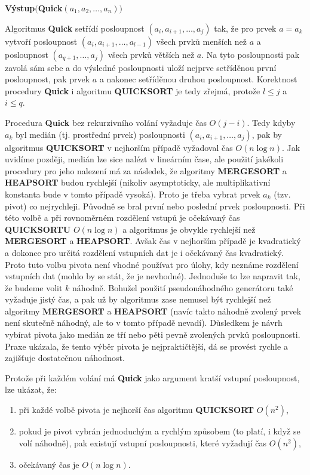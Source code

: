 \documentclass[a4paper,12pt]{article}
\begin{document}
{\bf Výstup$($Quick$(a_1,a_2,\dots,a_n))$

}
Algoritmus {\bf Quick} setřídí posloupnost 
$(a_i,a_{i+1},\dots,a_j)$ tak, že pro prvek $a=a_k$ vytvoří posloupnost 
$(a_i,a_{i+1},\dots,a_{l-1})$ všech prvků menších než $
a$ 
a posloupnost
$(a_{q+1},\dots,a_j)$ všech prvků 
větších než $a$. Na tyto posloupnosti pak 
zavolá sám sebe a do výsledné posloupnosti uloží 
nejprve setříděnou první posloupnost, pak prvek $a$ a nakonec 
setříděnou druhou posloupnost. Korektnost procedury 
{\bf Quick}  i algoritmu {\bf QUICKSORT} je tedy zřejmá, protože 
$l\le j$ a $i\le q$. 

Procedura {\bf Quick} bez rekurzivního volání 
vyžaduje čas $O(j-i)$. Tedy kdyby $a_k$ byl medián (tj. 
prostřední prvek) posloupnosti $(a_i,a_{i+1},\dots,a_j)$, pak 
by algoritmus {\bf QUICKSORT} v nejhorším případě vy\-žadoval čas $
O(n\log n)$. Jak 
uvidíme později, medián lze sice nalézt v lineár\-ním čase, ale 
použití jakékoli procedury pro jeho nalezení má za 
následek, že algoritmy {\bf MERGESORT} a {\bf HEAPSORT }
budou rychlejší (nikoliv asymptoticky, ale 
multiplikativní konstanta bude v tomto případě vysoká). Proto je třeba 
vybrat prvek $a_k$ (tzv. pivot) co 
nejrychleji. Původně se bral první nebo 
poslední prvek posloupnosti. Při této volbě a při 
rovnoměrném rozdělení vstupů je 
očekávaný čas {\bf QUICKSORTU} $O(n\log n)$ a algoritmus je 
obvykle rychlejší než {\bf MERGESORT} a 
{\bf HEAPSORT}. Avšak čas v nejhorším případě je 
kvadratický a dokonce pro určitá rozdělení vstupních dat 
je i očekávaný čas kvadratický. 
Proto tuto volbu pivota není vhodné používat pro úlohy, kdy 
neznáme rozdělení vstupních dat (mohlo by se stát, že je 
nevhodné). Jednoduše to lze napravit tak, že budeme volit $
k$ náhodně. Bohužel 
použití pseudonáhodného generátoru také vyžaduje jistý čas, a pak 
už by algoritmus zase nemusel být rychlejší než algoritmy 
{\bf MERGESORT} a {\bf HEAPSORT} (navíc takto náhodně zvolený 
prvek není skutečně náhodný, ale to v tomto případě 
nevadí). Důsledkem je návrh vybírat pivota jako 
medián ze tří nebo pěti pevně zvolených prvků 
posloupnosti. Praxe ukázala, že tento výběr pivota je 
nej\-praktičtější, dá se provést rychle a zajišťuje 
dostatečnou ná\-hod\-nost.

Protože při každém volání má {\bf Quick} jako 
argument kratší 
vstupní posloupnost, lze ukázat, že:
\begin{enumerate}
\item{}při každé volbě 
pivota je nejhorší čas algoritmu {\bf QUICKSORT} $O(n^2
)$,
\item{}pokud je pivot vybrán jedno\-du\-chým a rychlým 
způsobem (to platí, i když se volí náhodně), pak 
exi\-stují vstupní posloupnosti, které vyžadují čas $
O(n^2)$,
\item{}očekávaný čas je $O(n\log n)$.
\end{enumerate}
\end{document}
